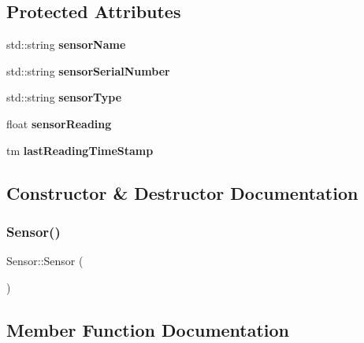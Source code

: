 \subsection*{Protected Attributes}
\begin{DoxyCompactItemize}
\item 
\mbox{\label{class_sensor_a636aa0945b0b99ccd71a02a8f552b9b5}} 
std\+::string {\bfseries sensor\+Name}
\item 
\mbox{\label{class_sensor_abecc0caf1d4129a2da059ad3f28ed741}} 
std\+::string {\bfseries sensor\+Serial\+Number}
\item 
\mbox{\label{class_sensor_ab83aea6e8f7690eb6abb6d30d97c5a94}} 
std\+::string {\bfseries sensor\+Type}
\item 
\mbox{\label{class_sensor_a3bfa0c158dc7e968bbb5990e031c7634}} 
float {\bfseries sensor\+Reading}
\item 
\mbox{\label{class_sensor_af94e2e6fe881a2be3d112f4c0b434090}} 
tm {\bfseries last\+Reading\+Time\+Stamp}
\end{DoxyCompactItemize}


\subsection{Constructor \& Destructor Documentation}
\mbox{\label{class_sensor_a342d6d11ef572c8cba92cb76fb1a294b}} 
\subsubsection{\texorpdfstring{Sensor()}{Sensor()}}
{\footnotesize\ttfamily Sensor\+::\+Sensor (\begin{DoxyParamCaption}{ }\end{DoxyParamCaption})}







\subsection{Member Function Documentation}
\mbox{\label{class_sensor_a7a14fc550fd1c126f256925d07214d27}} 
